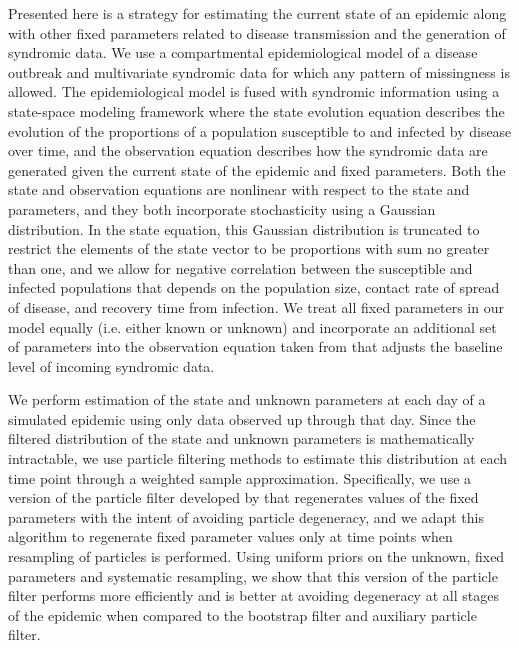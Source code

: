 
Presented here is a strategy for estimating the current state of an epidemic along with other fixed parameters related to disease transmission and the generation of syndromic data. We use a compartmental epidemiological model of a disease outbreak and multivariate syndromic data for which any pattern of missingness is allowed. The epidemiological model is fused with syndromic information using a state-space modeling framework where the state evolution equation describes the evolution of the proportions of a population susceptible to and infected by disease over time, and the observation equation describes how the syndromic data are generated given the current state of the epidemic and fixed parameters. Both the state and observation equations are nonlinear with respect to the state and parameters, and they both incorporate stochasticity using a Gaussian distribution. In the state equation, this Gaussian distribution is truncated to restrict the elements of the state vector to be proportions with sum no greater than one, and we allow for negative correlation between the susceptible and infected populations that depends on the population size, contact rate of spread of disease, and recovery time from infection. We treat all fixed parameters in our model equally (i.e. either known or unknown) and incorporate an additional set of parameters into the observation equation taken from \citet{skvortsov2012monitoring} that adjusts the baseline level of incoming syndromic data.

We perform estimation of the state and unknown parameters at each day of a simulated epidemic using only data observed up through that day. Since the filtered distribution of the state and unknown parameters is mathematically intractable, we use particle filtering methods to estimate this distribution at each time point through a weighted sample approximation. Specifically, we use a version of the particle filter developed by \citet{Liu:West:comb:2001} that regenerates values of the fixed parameters with the intent of avoiding particle degeneracy, and we adapt this algorithm to regenerate fixed parameter values only at time points when resampling of particles is performed. Using uniform priors on the unknown, fixed parameters and systematic resampling, we show that this version of the particle filter performs more efficiently and is better at avoiding degeneracy at all stages of the epidemic when compared to the bootstrap filter and auxiliary particle filter.

